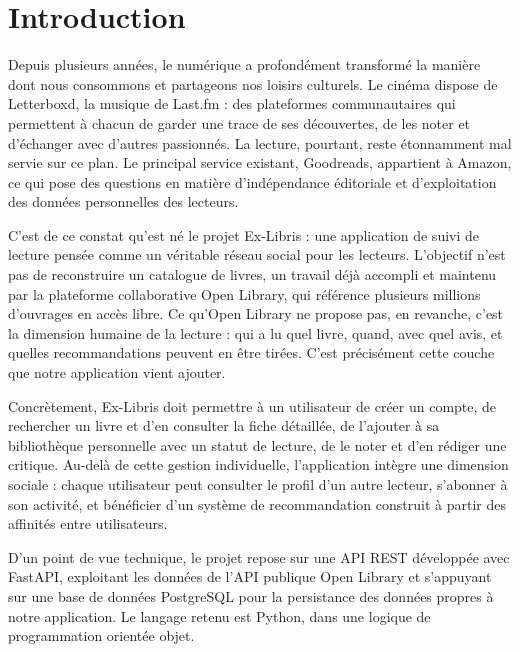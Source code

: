 \documentclass[
  letterpaper,
  DIV=11,
  numbers=noendperiod]{scrartcl}
\author{}
\date{}
\renewcommand*\contentsname{Table of contents}
\newcommand\contentsname{Table of contents}
\begin{document}
\renewcommand*\contentsname{Table des matières}
{
\setcounter{tocdepth}{3}
\tableofcontents
}

\newpage

\section{Introduction}\label{introduction}

Depuis plusieurs années, le numérique a profondément transformé la
manière dont nous consommons et partageons nos loisirs culturels. Le
cinéma dispose de Letterboxd, la musique de Last.fm : des plateformes
communautaires qui permettent à chacun de garder une trace de ses
découvertes, de les noter et d'échanger avec d'autres passionnés. La
lecture, pourtant, reste étonnamment mal servie sur ce plan. Le
principal service existant, Goodreads, appartient à Amazon, ce qui pose
des questions en matière d'indépendance éditoriale et d'exploitation des
données personnelles des lecteurs.

C'est de ce constat qu'est né le projet Ex-Libris : une application de
suivi de lecture pensée comme un véritable réseau social pour les
lecteurs. L'objectif n'est pas de reconstruire un catalogue de livres,
un travail déjà accompli et maintenu par la plateforme collaborative
Open Library, qui référence plusieurs millions d'ouvrages en accès
libre. Ce qu'Open Library ne propose pas, en revanche, c'est la
dimension humaine de la lecture : qui a lu quel livre, quand, avec quel
avis, et quelles recommandations peuvent en être tirées. C'est
précisément cette couche que notre application vient ajouter.

Concrètement, Ex-Libris doit permettre à un utilisateur de créer un
compte, de rechercher un livre et d'en consulter la fiche détaillée, de
l'ajouter à sa bibliothèque personnelle avec un statut de lecture, de le
noter et d'en rédiger une critique. Au-delà de cette gestion
individuelle, l'application intègre une dimension sociale : chaque
utilisateur peut consulter le profil d'un autre lecteur, s'abonner à son
activité, et bénéficier d'un système de recommandation construit à
partir des affinités entre utilisateurs.

D'un point de vue technique, le projet repose sur une API REST
développée avec FastAPI, exploitant les données de l'API publique Open
Library et s'appuyant sur une base de données PostgreSQL pour la
persistance des données propres à notre application. Le langage retenu
est Python, dans une logique de programmation orientée objet.
\end{document}

